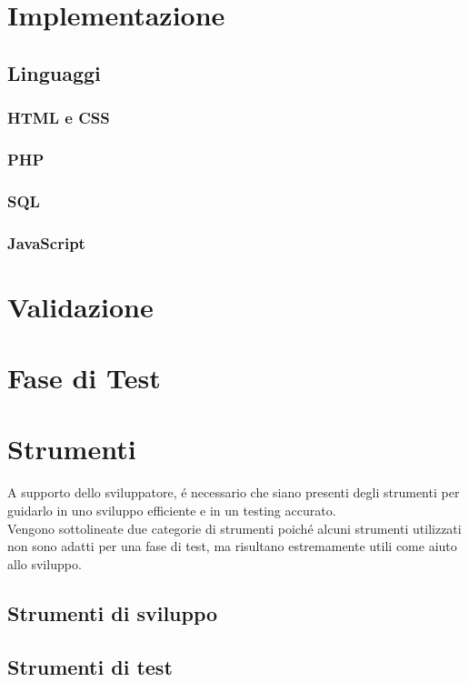 \documentclass[]{article}
\begin{document}
\section{Implementazione}
\subsection{Linguaggi}		
\subsubsection{HTML e CSS}	%
\subsubsection{PHP} %
\subsubsection{SQL}	%
\subsubsection{JavaScript} %

\section{Validazione}

\section{Fase di Test}

\section{Strumenti}
A supporto dello sviluppatore, é necessario che siano presenti degli strumenti per guidarlo in uno sviluppo efficiente e in un testing accurato.\\
Vengono sottolineate due categorie di strumenti poiché alcuni strumenti utilizzati non sono adatti per una fase di test, ma risultano estremamente utili come aiuto allo sviluppo.
\subsection{Strumenti di sviluppo}
\subsection{Strumenti di test}
\end{document}
